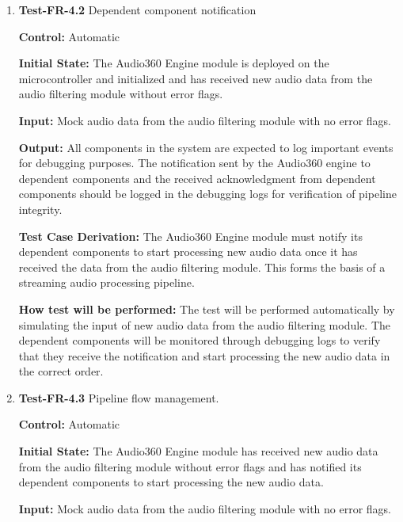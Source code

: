 \documentclass[12pt, titlepage]{article}
\begin{document}
\begin{enumerate}
\textbf{How test will be performed:}
Saved audio recordings from the microphone array will be used as artifacts in
the automated testing framework. Random audio data with error flags will be
generated at runtime. These tests will trigger when a pull request is made to
any branch. Inputs will be passed to the Audio360 Engine module, and outputs
will be checked against the expected outputs. 

\item{\textbf{Test-FR-4.2} Dependent component notification\\}

\textbf{Control:} Automatic

\textbf{Initial State:}
The Audio360 Engine module is deployed on the microcontroller and initialized
and has received new audio data from the audio filtering module without error
flags.

\textbf{Input:}
Mock audio data from the audio filtering module with no error flags.

\textbf{Output:}
All components in the system are expected to log important events for debugging
purposes. The notification sent by the Audio360 engine to dependent components
and the received acknowledgment from dependent components should be
logged in the debugging logs for verification of pipeline integrity. 

\textbf{Test Case Derivation:}
The Audio360 Engine module must notify its dependent components to start
processing new audio data once it has received the data from the audio filtering
module. This forms the basis of a streaming audio processing pipeline.

\textbf{How test will be performed:}
The test will be performed automatically by simulating the input of new audio
data from the audio filtering module. The dependent components will be monitored
through debugging logs to verify that they receive the notification and start
processing the new audio data in the correct order. 

\item{\textbf{Test-FR-4.3} Pipeline flow management.\\}

\textbf{Control:} Automatic

\textbf{Initial State:}
The Audio360 Engine module has received new audio data from the audio filtering
module without error flags and has notified its dependent components to start
processing the new audio data.

\textbf{Input:}
Mock audio data from the audio filtering module with no error flags.


\end{enumerate}
\end{document}
